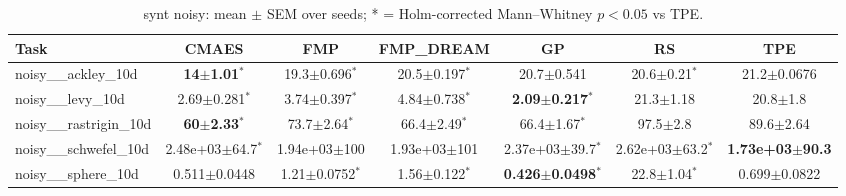 \begin{table}[t]
\caption{synt noisy: mean $\pm$ SEM over seeds; * = Holm-corrected Mann--Whitney $p<0.05$ vs TPE.}
\label{tab:synt_noisy}
\begin{center}\small
\begin{tabular}{lcccccc}
\hline
Task & CMAES & FMP & FMP\_DREAM & GP & RS & TPE \\
\hline
noisy\_\_ackley\_10d & \textbf{14$\pm$1.01}$^{*}$ & 19.3$\pm$0.696$^{*}$ & 20.5$\pm$0.197$^{*}$ & 20.7$\pm$0.541 & 20.6$\pm$0.21$^{*}$ & 21.2$\pm$0.0676 \\
noisy\_\_levy\_10d & 2.69$\pm$0.281$^{*}$ & 3.74$\pm$0.397$^{*}$ & 4.84$\pm$0.738$^{*}$ & \textbf{2.09$\pm$0.217}$^{*}$ & 21.3$\pm$1.18 & 20.8$\pm$1.8 \\
noisy\_\_rastrigin\_10d & \textbf{60$\pm$2.33}$^{*}$ & 73.7$\pm$2.64$^{*}$ & 66.4$\pm$2.49$^{*}$ & 66.4$\pm$1.67$^{*}$ & 97.5$\pm$2.8 & 89.6$\pm$2.64 \\
noisy\_\_schwefel\_10d & 2.48e+03$\pm$64.7$^{*}$ & 1.94e+03$\pm$100 & 1.93e+03$\pm$101 & 2.37e+03$\pm$39.7$^{*}$ & 2.62e+03$\pm$63.2$^{*}$ & \textbf{1.73e+03$\pm$90.3} \\
noisy\_\_sphere\_10d & 0.511$\pm$0.0448 & 1.21$\pm$0.0752$^{*}$ & 1.56$\pm$0.122$^{*}$ & \textbf{0.426$\pm$0.0498}$^{*}$ & 22.8$\pm$1.04$^{*}$ & 0.699$\pm$0.0822 \\
\hline
\end{tabular}
\end{center}
\end{table}
